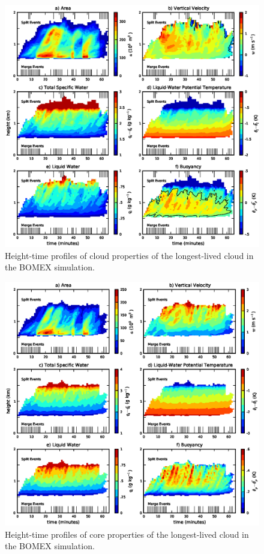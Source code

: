 \documentclass[acp]{copernicus}
\begin{document}
\begin{figure}[t]
\vspace*{2mm}
\begin{center}
\includegraphics[width=\textwidth]{./figures/example_cloud}
\end{center}
\caption{Height-time profiles of cloud properties of the longest-lived cloud 
in the BOMEX simulation.}
\label{fig:example_cloud}
\end{figure}

\begin{figure}[t]
\vspace*{2mm}
\begin{center}
\includegraphics[width=\textwidth]{./figures/example_core}
\end{center}
\caption{Height-time profiles of core properties of the longest-lived cloud in 
the BOMEX simulation.}
\label{fig:example_core}
\end{figure}
\end{document}
